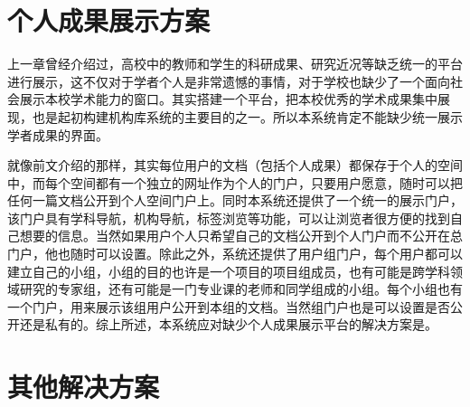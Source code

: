 \section{个人成果展示方案}
\label{sec:display}

上一章曾经介绍过，高校中的教师和学生的科研成果、研究近况等缺乏统一的平台进行展示，这不仅对于学者个人是非常遗憾的事情，对于学校也缺少了一个面向社会展示本校学术能力的窗口。其实搭建一个平台，把本校优秀的学术成果集中展现，也是起初构建机构库系统的主要目的之一。所以本系统肯定不能缺少统一展示学者成果的界面。

就像前文介绍的那样，其实每位用户的文档（包括个人成果）都保存于个人的空间中，而每个空间都有一个独立的网址作为个人的门户，只要用户愿意，随时可以把任何一篇文档公开到个人空间门户上。同时本系统还提供了一个统一的展示门户，该门户具有学科导航，机构导航，标签浏览等功能，可以让浏览者很方便的找到自己想要的信息。当然如果用户个人只希望自己的文档公开到个人门户而不公开在总门户，他也随时可以设置。除此之外，系统还提供了用户组门户，每个用户都可以建立自己的小组，小组的目的也许是一个项目的项目组成员，也有可能是跨学科领域研究的专家组，还有可能是一门专业课的老师和同学组成的小组。每个小组也有一个门户，用来展示该组用户公开到本组的文档。当然组门户也是可以设置是否公开还是私有的。综上所述，本系统应对缺少个人成果展示平台的解决方案是。

\section{其他解决方案}
\label{sec:project}

